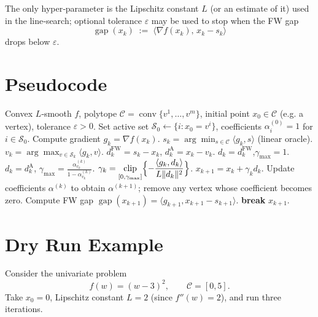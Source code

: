 \documentclass{article}
\newcommand{\C}{\mathcal{C}}
\newcommand{\gap}{\operatorname{gap}}
\begin{document}
The only hyper‑parameter is the Lipschitz constant $L$ (or an estimate of it) used in the line‑search; optional tolerance $\varepsilon$ may be used to stop when the FW gap
\[
\gap(x_{k})\;:=\;\langle \nabla f(x_{k}),\,x_{k}-s_{k}\rangle
\]
drops below $\varepsilon$.

\section*{Pseudocode}
\begin{algorithm}[H]
\caption{Away–Step Frank–Wolfe (AFW)}
\begin{algorithmic}[1]
\REQUIRE Convex $L$‑smooth $f$, polytope $\C=\operatorname{conv}\{v^{1},\dots ,v^{m}\}$,
initial point $x_{0}\in\C$ (e.g. a vertex), tolerance $\varepsilon>0$.
\STATE Set active set $\mathcal{S}_{0}\gets\{i: x_{0}=v^{i}\}$,
coefficients $\alpha^{(0)}_{i}=1$ for $i\in\mathcal{S}_{0}$.
    \STATE Compute gradient $g_{k}= \nabla f(x_{k})$.
    \STATE $s_{k}= \arg\min_{s\in\C}\langle g_{k},s\rangle$ (linear oracle).
    \STATE $v_{k}= \arg\max_{v\in\mathcal{S}_{k}}\langle g_{k},v\rangle$.
    \STATE $d^{\text{FW}}_{k}=s_{k}-x_{k}$,\;
          $d^{\text{A}}_{k}=x_{k}-v_{k}$.
        \STATE $d_{k}=d^{\text{FW}}_{k}$,\quad $\gamma_{\max}=1$.
    \ELSE
        \STATE $d_{k}=d^{\text{A}}_{k}$,\quad 
        $\displaystyle\gamma_{\max}= \frac{\alpha^{(k)}_{v_{k}}}{1-\alpha^{(k)}_{v_{k}}}$.
    \ENDIF
    \STATE $\displaystyle\gamma_{k}= \operatorname*{clip}_{[0,\gamma_{\max}]}
            \Bigl\{-\frac{\langle g_{k},d_{k}\rangle}{L\|d_{k}\|^{2}}\Bigr\}$.
    \STATE $x_{k+1}=x_{k}+ \gamma_{k} d_{k}$.
    \STATE Update coefficients $\alpha^{(k)}$ to obtain $\alpha^{(k+1)}$;
          remove any vertex whose coefficient becomes zero.
    \STATE Compute FW gap $\gap(x_{k+1})=\langle g_{k+1},x_{k+1}-s_{k+1}\rangle$.
    \IF{$\gap(x_{k+1})\le \varepsilon$}
        \STATE \textbf{break}
    \ENDIF
\ENDFOR
\RETURN $x_{k+1}$.
\end{algorithmic}
\end{algorithm}

\section*{Dry Run Example}
Consider the univariate problem
\[
f(w)=(w-3)^{2},\qquad \C=[0,5].
\]
Take $x_{0}=0$, Lipschitz constant $L=2$ (since $f''(w)=2$), and run three iterations.
\end{document}
